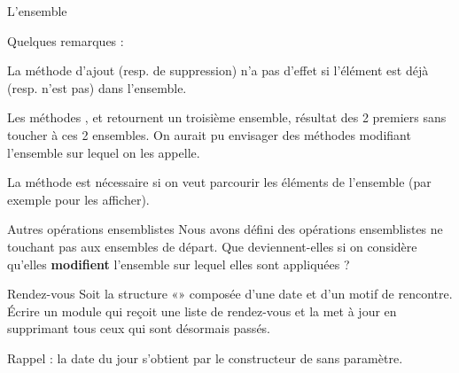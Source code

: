 \begin{Exercice}{L'ensemble}
	\bigskip

	Quelques remarques :

	\begin{liste}
		\item 
			La méthode d'ajout (resp. de suppression) n'a
			pas d'effet si l'élément est déjà
			(resp. n'est pas) dans l'ensemble.
		\item 
			Les méthodes , 
			 et 
			 retournent un troisième ensemble, 
			résultat des 2 premiers sans toucher
			à ces 2 ensembles. On aurait pu envisager des méthodes modifiant
			l'ensemble sur lequel on les appelle.
		\item 
			La méthode 
			est nécessaire si on veut parcourir les éléments de
			l'ensemble (par exemple pour les afficher).
	\end{liste}
\end{Exercice}

\begin{Exercice}{Autres opérations ensemblistes}
	Nous avons défini des opérations ensemblistes ne touchant pas aux
	ensembles de départ. Que deviennent-elles si on considère
	qu'elles \textbf{modifient}
	l'ensemble sur lequel elles sont appliquées ?
\end{Exercice}


\begin{Exercice}{Rendez-vous}
	Soit la structure «» composée d’une date
	et d’un motif de rencontre. Écrire un module qui reçoit une liste de
	rendez-vous et la met à jour en supprimant tous ceux qui sont désormais
	passés. 

	Rappel : la date du jour s'obtient par le constructeur de
	 sans paramètre.
\end{Exercice}
